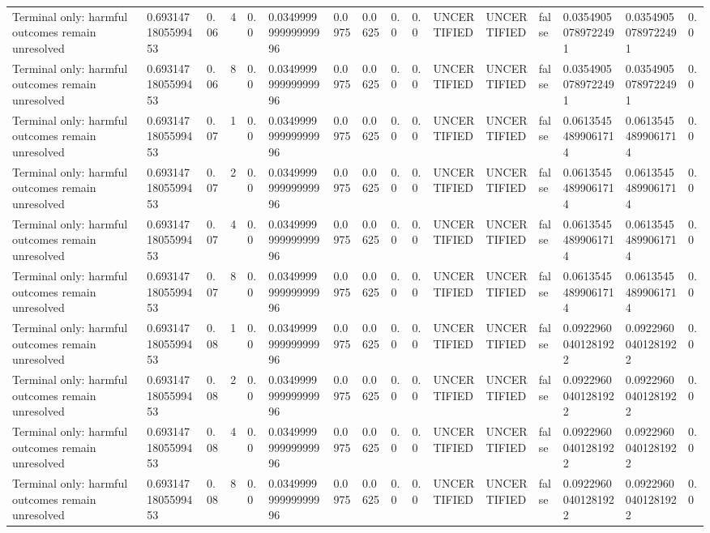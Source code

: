 \begin{tabular}{llllllllllllllll}
Terminal only: harmful outcomes remain unresolved & 0.6931471805599453 & 0.06 & 4 & 0.0 & 0.034999999999999996 & 0.0975 & 0.0625 & 0.0 & 0.0 & UNCERTIFIED & UNCERTIFIED & false & 0.03549050789722491 & 0.03549050789722491 & 0.0 \\
Terminal only: harmful outcomes remain unresolved & 0.6931471805599453 & 0.06 & 8 & 0.0 & 0.034999999999999996 & 0.0975 & 0.0625 & 0.0 & 0.0 & UNCERTIFIED & UNCERTIFIED & false & 0.03549050789722491 & 0.03549050789722491 & 0.0 \\
Terminal only: harmful outcomes remain unresolved & 0.6931471805599453 & 0.07 & 1 & 0.0 & 0.034999999999999996 & 0.0975 & 0.0625 & 0.0 & 0.0 & UNCERTIFIED & UNCERTIFIED & false & 0.06135454899061714 & 0.06135454899061714 & 0.0 \\
Terminal only: harmful outcomes remain unresolved & 0.6931471805599453 & 0.07 & 2 & 0.0 & 0.034999999999999996 & 0.0975 & 0.0625 & 0.0 & 0.0 & UNCERTIFIED & UNCERTIFIED & false & 0.06135454899061714 & 0.06135454899061714 & 0.0 \\
Terminal only: harmful outcomes remain unresolved & 0.6931471805599453 & 0.07 & 4 & 0.0 & 0.034999999999999996 & 0.0975 & 0.0625 & 0.0 & 0.0 & UNCERTIFIED & UNCERTIFIED & false & 0.06135454899061714 & 0.06135454899061714 & 0.0 \\
Terminal only: harmful outcomes remain unresolved & 0.6931471805599453 & 0.07 & 8 & 0.0 & 0.034999999999999996 & 0.0975 & 0.0625 & 0.0 & 0.0 & UNCERTIFIED & UNCERTIFIED & false & 0.06135454899061714 & 0.06135454899061714 & 0.0 \\
Terminal only: harmful outcomes remain unresolved & 0.6931471805599453 & 0.08 & 1 & 0.0 & 0.034999999999999996 & 0.0975 & 0.0625 & 0.0 & 0.0 & UNCERTIFIED & UNCERTIFIED & false & 0.09229600401281922 & 0.09229600401281922 & 0.0 \\
Terminal only: harmful outcomes remain unresolved & 0.6931471805599453 & 0.08 & 2 & 0.0 & 0.034999999999999996 & 0.0975 & 0.0625 & 0.0 & 0.0 & UNCERTIFIED & UNCERTIFIED & false & 0.09229600401281922 & 0.09229600401281922 & 0.0 \\
Terminal only: harmful outcomes remain unresolved & 0.6931471805599453 & 0.08 & 4 & 0.0 & 0.034999999999999996 & 0.0975 & 0.0625 & 0.0 & 0.0 & UNCERTIFIED & UNCERTIFIED & false & 0.09229600401281922 & 0.09229600401281922 & 0.0 \\
Terminal only: harmful outcomes remain unresolved & 0.6931471805599453 & 0.08 & 8 & 0.0 & 0.034999999999999996 & 0.0975 & 0.0625 & 0.0 & 0.0 & UNCERTIFIED & UNCERTIFIED & false & 0.09229600401281922 & 0.09229600401281922 & 0.0 \\

\end{tabular}
